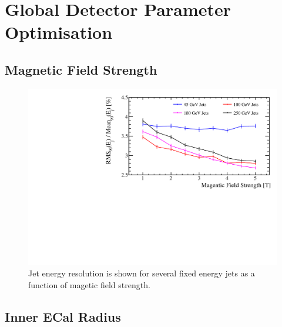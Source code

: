 \section{Global Detector Parameter Optimisation}
\label{optstud:sec:global}

\subsection{Magnetic Field Strength}
\label{optstud:sec:glob:bfield}

\begin{figure}
  \includegraphics[width=\largefigwidth]{OptimisationStudies/Plots/JER_vs_MagneticField.pdf}
  \caption[Jet energy resolution as a function of magnetic field strength.]{Jet energy resolution is shown for several fixed energy jets as a function of magetic field strength.}
  \label{optstud:fig:bfield}
\end{figure}

\subsection{Inner ECal Radius}
\label{optstud:sec:glob:ecalinnerrad}

